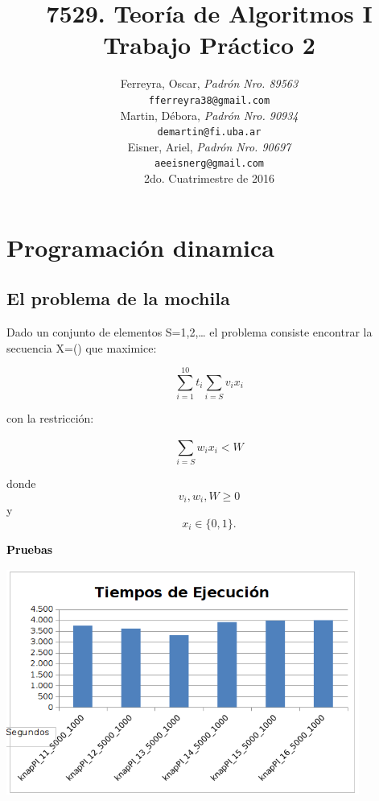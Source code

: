 \documentclass[a4paper,10pt]{article}
\title{ \textbf{ 7529. Teoría de Algoritmos I\\
Trabajo Práctico 2}}
\author{ Ferreyra, Oscar, \textit{Padrón Nro. 89563} \\
\texttt{ fferreyra38@gmail.com } \\[2.5ex]
Martin, Débora, \textit{Padrón Nro. 90934} \\
\texttt{ demartin@fi.uba.ar } \\[2.5ex]
Eisner, Ariel, \textit{Padrón Nro. 90697} \\
\texttt{ aeeisnerg@gmail.com } \\[2.5ex]
\normalsize{2do. Cuatrimestre de 2016} \\
}
\date{}
\begin{document}
\maketitle
\thispagestyle{empty} %
\setcounter{page}{0}
\newpage
\tableofcontents

\newpage

\section{Programación dinamica}


\subsection{El problema de la mochila}

Dado un conjunto de elementos S={1,2,{\dots}} el problema consiste encontrar la secuencia X=() que maximice:

\begin{equation*}
\displaystyle\sum_{i=1}^{10} t_i
\displaystyle\sum_{i=S}^{} v_ix_i
\end{equation*}

\bigskip

\textcolor[rgb]{0.06666667,0.06666667,0.06666667}{con la restricción:}

\begin{equation*}
\sum _{i = S}^{}w_ix_i<W
\end{equation*}

\bigskip

donde 
\begin{equation*}v_i, w_i, W \geq 0\end{equation*} y 
\begin{equation*} x_i \in \{0,1\}.\end{equation*}


\textbf{\textcolor{black}{Pruebas}}


\bigskip

{\centering
\includegraphics[width=11.589cm,height=7.482cm]{Tp27529-img003.png}
\par}
\end{document}
